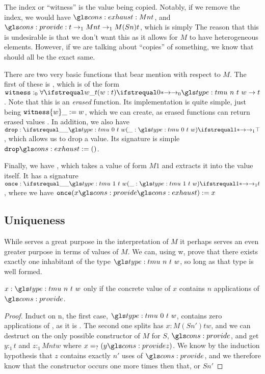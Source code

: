 The index or ``witness'' is the value being copied.
Notably, if we remove the index, we would have $\mz : M n t$, and $\ms : t \to_1 M n t \to_1 M (S n) t$, which is simply 
The reason that this is undesirable is that we don't want this as it allows for $M$ to have heterogeneous elements. 
However, if we are talking about ``copies'' of something, we know that should all be the exact same.

There are two very basic functions that bear mention with respect to $M$. The first of these is , which is of the form $\code{witness}:_0 \fa0 w : t . \tm n t w \to t$.
Note that this is an \emph{erased} function.
Its implementation is quite simple, just being $\mathtt{witness}\{w\} \_ := w$, which we can create, as erased functions can return erased values \needcite.
In addition, we also have $\code{drop}: \fn1 \_ : {\tm 0 t w} . \top$, which allows us to drop a value.
Its signature is simple $\code{drop}\mz \deq ()$.

Finally, we have , which takes a value of form $M 1$ and extracts it into the value itself.
It has a signature $\code{once}: \fn1 \_ : \tm 1 t w . t$, where we have $\code{once}(x \ms \mz) \deq x$

\subsection{Uniqueness}

While serves a great purpose in the interpretation of $M$ it perhaps serves an even greater purpose in terms of values of $M$.
We can, using \sigil w, prove that there exists exactly one inhabitant of the type $\tm n t w$, so long as that type is well formed.


\begin{lemma}
	$x : \tm n t w$ only if the concrete value of $x$ contains $n$ applications of $\ms$.
\end{lemma}
\begin{proof}
	Induct on \sigil n, the first case, $\tm 0 t w$, contains zero applications of \ms, as it is \mz.
	The second one splits has $x : M (S n') t w$, and we can destruct on the only possible constructor of $M$ for $S$, $\ms$, and get $y :_1 t$ and $z :_1 M n t w$ where $x \peq (y \ms z)$. 
	We know by the induction hypothesis that $z$ contains exactly $n'$ uses of $\ms$, and we therefore know that the constructor occurs one more times then that, or $S n'$
\end{proof}

